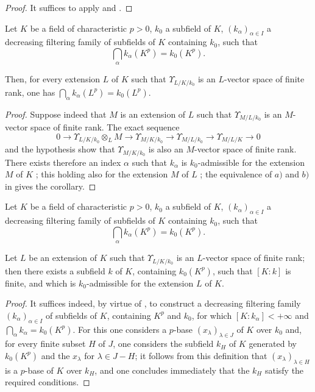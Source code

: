 \begin{proof}
It suffices to apply  and .
\end{proof}

\begin{corollary}[21.8.5]
\label{0.21.8.5}
Let $K$ be a field of characteristic $p>0$, $k_0$ a subfield of $K$, $(k_\alpha)_{\alpha\in I}$ a decreasing filtering family of subfields of $K$ containing $k_0$, such that
\[
  \bigcap_\alpha k_\alpha(K^p)=k_0(K^p).
\]

Then, for every extension $L$ of $K$ such that $\Upsilon_{L/K/k_0}$ is an $L$-vector space of finite rank, one has $\bigcap_\alpha k_\alpha(L^p)=k_0(L^p)$.
\end{corollary}

\begin{proof}
Suppose indeed that $M$ is an extension of $L$ such that $\Upsilon_{M/L/k_0}$ is an $M$-vector space of finite rank.
The exact sequence 
\[
  0\to\Upsilon_{L/K/k_0}\otimes_L M\to\Upsilon_{M/K/k_0}\to\Upsilon_{M/L/k_0}\to\Upsilon_{M/L/K}\to 0
\]
and the hypothesis show that $\Upsilon_{M/K/k_0}$ is also an $M$-vector space of finite rank.
There exists therefore an index $\alpha$ such that $k_\alpha$ is $k_0$-admissible for the extension $M$ of $K$ ; this holding also for the extension $M$ of $L$ ; the equivalence of $a)$ and $b)$ in  gives the corollary.
\end{proof}

\begin{corollary}[21.8.6]
\label{0.21.8.6}
Let $K$ be a field of characteristic $p>0$, $k_0$ a subfield of $K$, $(k_\alpha)_{\alpha\in I}$ a decreasing filtering family of subfields of $K$ containing $k_0$, such that
\[
  \bigcap_\alpha k_\alpha(K^p)=k_0(K^p).
\]

Let $L$ be an extension of $K$ such that $\Upsilon_{L/K/k_0}$ is an $L$-vector space of finite rank; then there exists a subfield $k$ of $K$, containing $k_0(K^p)$, such that $[K:k]$ is finite, and which is $k_0$-admissible for the extension $L$ of $K$.
\end{corollary}

\begin{proof}
It suffices indeed, by virtue of , to construct a decreasing filtering family $(k_\alpha)_{\alpha\in I}$ of subfields of $K$, containing $K^p$ and $k_0$, for which $[K:k_\alpha]<+\infty$ and $\bigcap_\alpha k_\alpha=k_0(K^p)$.
For this one considers a $p$-base $(x_\lambda)_{\lambda\in J}$ of $K$ over $k_0$ and, for every finite subset $H$ of $J$, one considers the subfield $k_H$ of $K$ generated by $k_0(K^p)$ and the $x_\lambda$ for $\lambda\in J-H$; it follows from this definition that $(x_\lambda)_{\lambda\in H}$ is a $p$-base of $K$ over $k_H$, and one concludes immediately that the $k_H$ satisfy the required conditions.
\end{proof}

